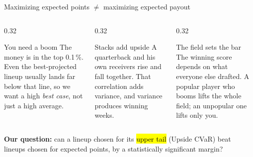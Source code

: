 \begin{frame}{Maximizing expected points $\neq$ maximizing expected payout}
  \begin{columns}[t]
    \begin{column}{0.32\textwidth}
      \begin{block}{You need a boom}
        The money is in the top 0.1\,\%. Even the best-projected lineup usually lands far
        below that line, so we want a high \emph{best case}, not just a high average.
      \end{block}
    \end{column}
    \begin{column}{0.32\textwidth}
      \begin{block}{Stacks add upside}
        A quarterback and his own receivers rise and fall together. That correlation adds
        variance, and variance produces winning weeks.
      \end{block}
    \end{column}
    \begin{column}{0.32\textwidth}
      \begin{block}{The field sets the bar}
        The winning score depends on what everyone else drafted. A popular player who
        booms lifts the whole field; an unpopular one lifts only you.
      \end{block}
    \end{column}
  \end{columns}
  \vspace{1.5em}
  \textbf{Our question:} can a lineup chosen for its \hl{upper tail} (Upside CVaR) beat
  lineups chosen for expected points, by a statistically significant margin?
\end{frame}

